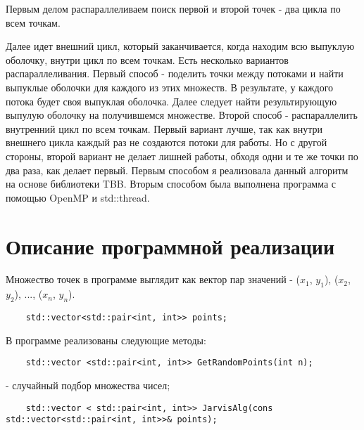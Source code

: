 \documentclass{report}
\begin{document}
\par Первым делом распараллеливаем поиск первой и второй точек - два цикла по всем точкам.

\par Далее идет внешний цикл, который заканчивается, когда находим всю выпуклую оболочку, внутри цикл по всем точкам. Есть несколько вариантов распараллеливания. Первый способ - поделить точки между потоками и найти выпуклые оболочки для каждого из этих множеств. В результате, у каждого потока будет своя выпуклая оболочка. Далее следует найти результирующую выпулую оболочку на получившемся множестве. Второй способ - распараллелить внутренний цикл по всем точкам. Первый вариант лучше, так как внутри внешнего цикла каждый раз не создаются потоки для работы. Но с другой стороны, второй вариант не делает лишней работы, обходя одни и те же точки по два раза, как делает первый. Первым способом я реализовала данный алгоритм на основе библиотеки TBB. Вторым способом была выполнена программа с помощью OpenMP и std::thread.

\newpage

\section{Описание программной реализации}
Множество точек в программе выглядит как вектор пар значений - {($x_{1}$, $y_{1}$), ($x_{2}$, $y_{2}$), ..., ($x_{n}$, $y_{n}$)}.

\vspace{10pt}
\begin{lstlisting}
	std::vector<std::pair<int, int>> points;
\end{lstlisting}
\vspace{-25pt}

\par В программе реализованы следующие методы:

\vspace{10pt}
\begin{lstlisting}
	std::vector <std::pair<int, int>> GetRandomPoints(int n);
\end{lstlisting}
\vspace{-25pt}

- случайный подбор множества чисел;

\vspace{10pt}
\begin{lstlisting}
	std::vector < std::pair<int, int>> JarvisAlg(cons std::vector<std::pair<int, int>>& points);
\end{lstlisting}
\vspace{-25pt}
\end{document}
